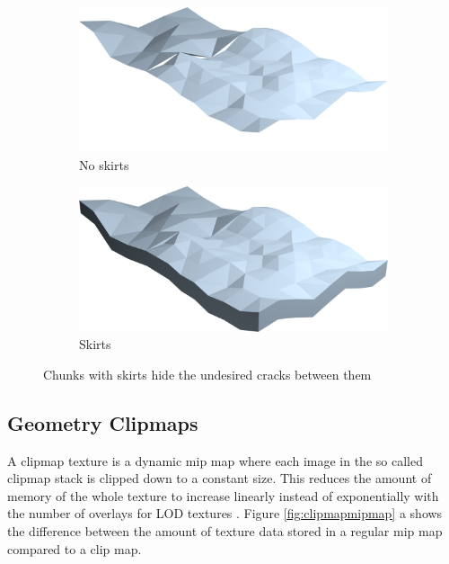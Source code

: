 \begin{figure}[htbp]
    \centering
    \begin{subfigure}[bt]{0.4\textwidth}
        \includegraphics[width=\textwidth]{figures/chunkedlod/skirts_without.png}
        \caption{No skirts}
    \end{subfigure}
    \begin{subfigure}[bt]{0.4\textwidth}
        \includegraphics[width=\textwidth]{figures/chunkedlod/skirts_with.png}
        \caption{Skirts}
    \end{subfigure}
    \caption{Chunks with skirts hide the undesired cracks between them}
    \label{fig:skirts}
\end{figure}


\subsection{Geometry Clipmaps}
A clipmap texture is a dynamic mip map where each image in the so called clipmap stack is clipped down to a constant size. This reduces the amount of memory of the whole texture to increase linearly instead of exponentially with the number of overlays for LOD textures \cite{tanner98}. Figure \ref{fig:clipmapmipmap} a shows the difference between the amount of texture data stored in a regular mip map compared to a clip map.

